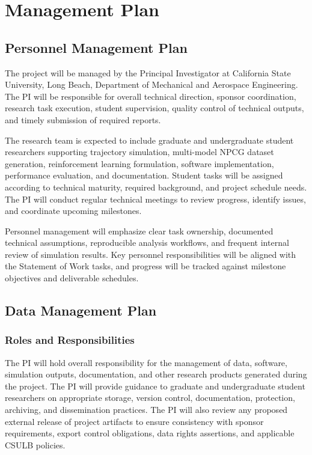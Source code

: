 \section{Management Plan}

\subsection{Personnel Management Plan}

The project will be managed by the Principal Investigator at California State University, Long Beach, Department of Mechanical and Aerospace Engineering. The PI will be responsible for overall technical direction, sponsor coordination, research task execution, student supervision, quality control of technical outputs, and timely submission of required reports.

The research team is expected to include graduate and undergraduate student researchers supporting trajectory simulation, multi-model NPCG dataset generation, reinforcement learning formulation, software implementation, performance evaluation, and documentation. Student tasks will be assigned according to technical maturity, required background, and project schedule needs. The PI will conduct regular technical meetings to review progress, identify issues, and coordinate upcoming milestones.

Personnel management will emphasize clear task ownership, documented technical assumptions, reproducible analysis workflows, and frequent internal review of simulation results. Key personnel responsibilities will be aligned with the Statement of Work tasks, and progress will be tracked against milestone objectives and deliverable schedules.

\subsection{Data Management Plan}

\subsubsection{Roles and Responsibilities}

The PI will hold overall responsibility for the management of data, software, simulation outputs, documentation, and other research products generated during the project. The PI will provide guidance to graduate and undergraduate student researchers on appropriate storage, version control, documentation, protection, archiving, and dissemination practices. The PI will also review any proposed external release of project artifacts to ensure consistency with sponsor requirements, export control obligations, data rights assertions, and applicable CSULB policies.

